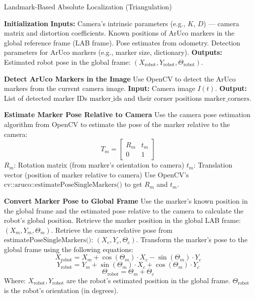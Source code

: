 \documentclass{CSSRforAfrica}
\begin{document}
\begin{algorithm}
\caption{Landmark-Based Absolute Localization (Triangulation)}
\begin{algorithmic}[1]
\State \textbf{Initialization}
\State \textbf{Inputs:}
\State \quad Camera's intrinsic parameters (e.g., $K$, $D$) — camera matrix and distortion coefficients.
\State \quad Known positions of ArUco markers in the global reference frame (LAB frame).
\State \quad Pose estimates from odometry.
\State \quad Detection parameters for ArUco markers (e.g., marker size, dictionary).
\State \textbf{Outputs:}
\State \quad Estimated robot pose in the global frame: $(X_{\text{robot}}, Y_{\text{robot}}, \Theta_{\text{robot}})$.

\State \textbf{Detect ArUco Markers in the Image}
\State Use OpenCV to detect the ArUco markers from the current camera image.
\State \textbf{Input:} Camera image $I(t)$.
\State \textbf{Output:} List of detected marker IDs $\text{marker\_ids}$ and their corner positions $\text{marker\_corners}$.

\State \textbf{Estimate Marker Pose Relative to Camera}
    \State Use the camera pose estimation algorithm from OpenCV to estimate the pose of the marker relative to the camera:
    \[
    T_m = \begin{bmatrix}
    R_m & t_m \\
    0 & 1
    \end{bmatrix}
    \]
    \State $R_m$: Rotation matrix (from marker’s orientation to camera)
    \State $t_m$: Translation vector (position of marker relative to camera)
    \State Use OpenCV’s $\text{cv::aruco::estimatePoseSingleMarkers()}$ to get $R_m$ and $t_m$.
\EndFor

\State \textbf{Convert Marker Pose to Global Frame}
    \State Use the marker's known position in the global frame and the estimated pose relative to the camera to calculate the robot's global position.
    \State Retrieve the marker position in the global LAB frame: $(X_m, Y_m, \Theta_m)$.
    \State Retrieve the camera-relative pose from $\text{estimatePoseSingleMarkers()}$: $(X_c, Y_c, \Theta_c)$.
    \State Transform the marker's pose to the global frame using the following equations:
    \[
    X_{\text{robot}} = X_m + \cos(\Theta_m) \cdot X_c - \sin(\Theta_m) \cdot Y_c
    \]
    \[
    Y_{\text{robot}} = Y_m + \sin(\Theta_m) \cdot X_c + \cos(\Theta_m) \cdot Y_c
    \]
    \[
    \Theta_{\text{robot}} = \Theta_m + \Theta_c
    \]
    \State Where:
    \State $X_{\text{robot}}, Y_{\text{robot}}$ are the robot's estimated position in the global frame.
    \State $\Theta_{\text{robot}}$ is the robot’s orientation (in degrees).
\EndFor

\end{algorithmic}
\end{algorithm}
\end{document}
